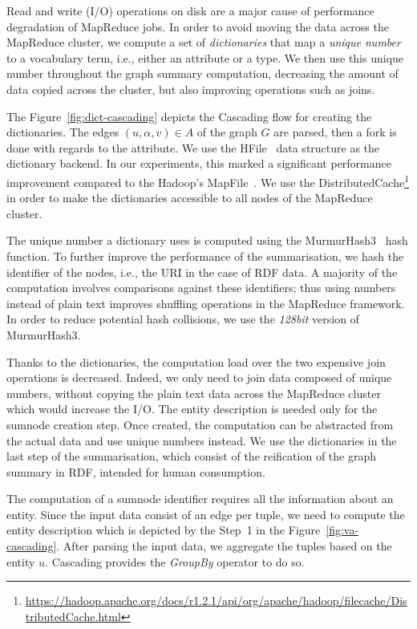 
Read and write (I/O) operations on disk are a major cause of performance degradation of MapReduce jobs. In order to avoid moving the data across the MapReduce cluster, we compute a set of \emph{dictionaries} that map a \emph{unique number} to a vocabulary term, i.e., either an attribute or a type. We then use this unique number throughout the graph summary computation, decreasing the amount of data copied across the cluster, but also improving operations such as joins.

The Figure~\ref{fig:dict-cascading} depicts the Cascading flow for creating the dictionaries. The edges $(u, \alpha, v) \in A$ of the graph $G$ are parsed, then a fork is done with regards to the attribute. We use the HFile~\cite{hfile} data structure as the dictionary backend. In our experiments, this marked a significant performance improvement compared to the Hadoop's MapFile~\cite{mapfile}. We use the DistributedCache\footnote{\url{https://hadoop.apache.org/docs/r1.2.1/api/org/apache/hadoop/filecache/DistributedCache.html}} in order to make the dictionaries accessible to all nodes of the MapReduce cluster.

The unique number a dictionary uses is computed using the MurmurHash3~\cite{murmurhash3-gcode,murmurhash3-blog} hash function. To further improve the performance of the summarisation, we hash the identifier of the nodes, i.e., the URI in the case of RDF data. A majority of the computation involves comparisons against these identifiers; thus using numbers instead of plain text improves shuffling operations in the MapReduce framework. In order to reduce potential hash collisions, we use the \emph{128bit} version of MurmurHash3.

Thanks to the dictionaries, the computation load over the two expensive join operations is decreased. Indeed, we only need to join data composed of unique numbers, without copying the plain text data across the MapReduce cluster which would increase the I/O. The entity description is needed only for the sumnode creation step. Once created, the computation can be abstracted from the actual data and use unique numbers instead. We use the dictionaries in the last step of the summarisation, which consist of the reification of the graph summary in RDF, intended for human consumption.


The computation of a sumnode identifier requires all the information about an entity. Since the input data consist of an edge per tuple, we need to compute the entity description  which is depicted by the Step~1 in the Figure~\ref{fig:va-cascading}. After parsing the input data, we aggregate the tuples based on the entity $u$. Cascading provides the \emph{GroupBy} operator to do so.

